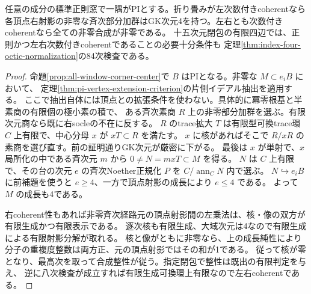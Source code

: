 \begin{theorem}\label{thm:coherent-pi-regular-domains}
任意の成分の標準正則窓で一隅がPIとする。折り畳みが左次数付きcoherentなら
各頂点右射影の非零な斉次部分加群はGK次元4を持つ。左右とも次数付きcoherentなら全ての非零合成が非零である。
十五次元閉包の有限四辺では、正則かつ左右次数付きcoherentであることの必要十分条件も
定理\ref{thm:index-four-octic-normalization}の84次検査である。
\end{theorem}
\begin{proof}
命題\ref{prop:all-window-corner-center}で $B$ はPIとなる。非零な $M\subset e_iB$ において、
定理\ref{thm:pi-vertex-extension-criterion}の片側イデアル抽出を適用する。
ここで抽出自体には頂点との拡張条件を使わない。具体的に冪零根基と半素商の有限個の極小素の積で、
ある斉次素商 $R$ 上の非零部分加群を選ぶ。有限次元商なら既に右socleの不在に反する。
$R$ のtrace拡大 $T$ は有限型可換trace環 $C$ 上有限で、中心分母 $x$ が $xT\subset R$ を満たす。
$x$ に核があればそこで $R/xR$ の素商を選び直す。前の証明通りGK次元が厳密に下がる。
最後は $x$ が単射で、$x$ 局所化の中である斉次元 $m$ から $0\ne N=mxT\subset M$ を得る。
$N$ は $C$ 上有限で、その台の次元 $e$ の斉次Noether正規化 $P$ を $C/\operatorname{ann}_C N$ 内で選ぶ。
$N\hookrightarrow e_iB$ に前補題を使うと $e\ge4$、一方で頂点射影の成長により $e\le4$ である。
よって $M$ の成長も4である。

右coherent性もあれば非零斉次経路元の頂点射影間の左乗法は、核・像の双方が有限生成かつ有限表示である。
逐次核も有限生成、大域次元は4なので有限生成による有限射影分解が取れる。
核と像がともに非零なら、上の成長純性により分子の重複度整数は両方正、元の頂点射影ではその和が1である。
従って核が零となり、最高次を取って合成整性が従う。指定閉包で整性は既出の有限判定を与え、
逆に八次検査が成立すれば有限生成可換環上有限なので左右coherentである。
\end{proof}
